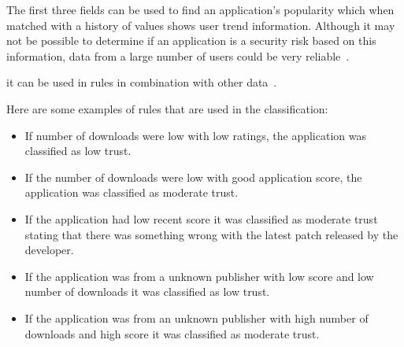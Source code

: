 The first three fields can be used to find an application’s
popularity which when matched with a history of values shows
user trend information.  Although it may not be possible to determine if an
application is a security risk based on this
information, data from a large number of users could be very reliable~\cite{}.

it can be used in rules in combination with other data~\cite{jing2014riskmon}.

Here are some examples of rules that are used in the classification: 
\begin{itemize}
  \item If number of downloads were low with low ratings, the
    application was classified as low trust.
  \item If the number of downloads were low with good application
    score, the application was classified as moderate trust.
  \item If the application had low recent score it was classified as moderate trust
    stating that there was something wrong with the latest patch released by the developer.
  \item If the application was from a unknown publisher with low score
    and low number of downloads it was classified as low trust.
  \item If the application was from an unknown publisher with high
    number of downloads and high score it was classified as moderate trust.
\end{itemize}
